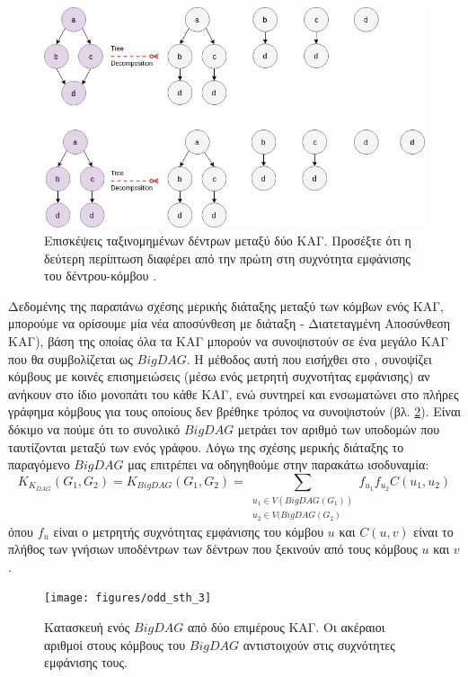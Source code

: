 \begin{figure}[]
\centering
\includegraphics[width=\textwidth]{figures/odd_sth_2}
\caption{Επισκέψεις ταξινομημένων δέντρων μεταξύ δύο ΚΑΓ. Προσέξτε ότι η δεύτερη περίπτωση διαφέρει από την πρώτη στη συχνότητα εμφάνισης του δέντρου-κόμβου .}
\label{fig:odd_sth_2}
\end{figure}

Δεδομένης της παραπάνω σχέσης μερικής διάταξης μεταξύ των κόμβων ενός ΚΑΓ, μπορούμε να ορίσουμε μία νέα αποσύνθεση με διάταξη  - Διατεταγμένη Αποσύνθεση ΚΑΓ), βάση της οποίας όλα τα ΚΑΓ μπορούν να συνοψιστούν σε ένα μεγάλο ΚΑΓ που θα συμβολίζεται ως $BigDAG$.
Η μέθοδος αυτή που εισήχθει στο \cite[MinimalDAG:  2, p. 3]{Martino2006}, συνοψίζει κόμβους με κοινές επισημειώσεις (μέσω ενός μετρητή συχνοτήτας εμφάνισης) αν ανήκουν στο ίδιο μονοπάτι του κάθε ΚΑΓ, ενώ συντηρεί και ενσωματώνει στο πλήρες γράφημα κόμβους για τους οποίους δεν βρέθηκε τρόπος να συνοψιστούν  (βλ. \ref{fig:odd_sth_3}).
Είναι δόκιμο να πούμε ότι το συνολικό $BigDAG$ μετράει τον αριθμό των υποδομών που ταυτίζονται μεταξύ των  ενός γράφου.
Λόγω της σχέσης μερικής διάταξης το παραγόμενο $BigDAG$ μας επιτρέπει να οδηγηθούμε στην παρακάτω ισοδυναμία:
\begin{equation}
K_{K_{DAG}}(G_{1}, G_{2}) = K_{BigDAG}(G_{1}, G_{2}) = \sum_{\substack{u_{1} \in V(BigDAG(G_{1}))\\ u_{2} \in V(BigDAG(G_{2})}} f_{u_{1}}f_{u_{2}}C(u_{1}, u_{2})
\end{equation}
όπου $f_{u}$ είναι ο μετρητής συχνότητας εμφάνισης του κόμβου $u$ και $C(u, v)$ είναι το πλήθος των γνήσιων υποδέντρων των δέντρων που ξεκινούν από τους κόμβους $u$ και $v$.
\begin{figure}[]
\centering
\texttt{[image: figures/odd\_sth\_3]}
\caption{Κατασκευή ενός $BigDAG$ από δύο επιμέρους ΚΑΓ. Οι ακέραιοι αριθμοί στους κόμβους του $BigDAG$ αντιστοιχούν στις συχνότητες εμφάνισης τους.}
\label{fig:odd_sth_3}
\end{figure}

